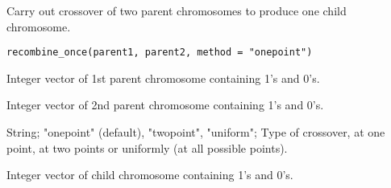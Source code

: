 %
\begin{Description}\relax
Carry out crossover of two parent chromosomes to produce one child chromosome.
\end{Description}
%
\begin{Usage}
\begin{verbatim}
recombine_once(parent1, parent2, method = "onepoint")
\end{verbatim}
\end{Usage}
%
\begin{Arguments}
\begin{ldescription}
\item[\code{parent1}] Integer vector of 1st parent chromosome containing 1's and 0's.

\item[\code{parent2}] Integer vector of 2nd parent chromosome containing 1's and 0's.

\item[\code{method}] String; "onepoint" (default), "twopoint", "uniform";
Type of crossover, at one point, at two points or uniformly (at all possible points).
\end{ldescription}
\end{Arguments}
%
\begin{Value}
Integer vector of child chromosome containing 1's and 0's.
\end{Value}
